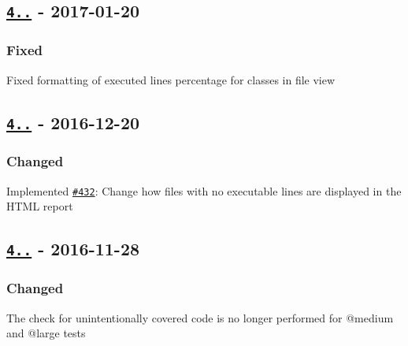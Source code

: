 \subsection*{\href{https://github.com/sebastianbergmann/php-code-coverage/compare/4.0.4...4.0.5}{\tt 4..} -\/ 2017-\/01-\/20}

\subsubsection*{Fixed}


\begin{DoxyItemize}
\item Fixed formatting of executed lines percentage for classes in file view
\end{DoxyItemize}

\subsection*{\href{https://github.com/sebastianbergmann/php-code-coverage/compare/4.0.3...4.0.4}{\tt 4..} -\/ 2016-\/12-\/20}

\subsubsection*{Changed}


\begin{DoxyItemize}
\item Implemented \href{https://github.com/sebastianbergmann/php-code-coverage/issues/432}{\tt \#432}\+: Change how files with no executable lines are displayed in the H\+T\+ML report
\end{DoxyItemize}

\subsection*{\href{https://github.com/sebastianbergmann/php-code-coverage/compare/4.0.2...4.0.3}{\tt 4..} -\/ 2016-\/11-\/28}

\subsubsection*{Changed}


\begin{DoxyItemize}
\item The check for unintentionally covered code is no longer performed for {\ttfamily @medium} and {\ttfamily @large} tests
\end{DoxyItemize}

